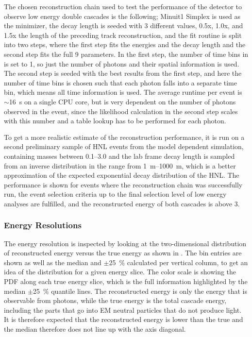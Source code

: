 The chosen reconstruction chain used to test the performance of the detector to observe low energy double cascades is the following; Minuit1 Simplex is used as the minimizer, the decay length is seeded with 3 different values, 0.5x, 1.0x, and 1.5x the length of the preceding track reconstruction, and the fit routine is split into two steps, where the first step fits the energies and the decay length and the second step fits the full 9 parameters. In the first step, the number of time bins in  is set to 1, so just the number of photons and their spatial information is used. The second step is seeded with the best results from the first step, and here the number of time bins is chosen such that each photon falls into a separate time bin, which means all time information is used. The average runtime per event is $\sim$\SI{16}{\second} on a single CPU core, but is very dependent on the number of photons observed in the event, since the likelihood calculation in the second step scales with this number and a table lookup has to be performed for each photon.

To get a more realistic estimate of the reconstruction performance, it is run on a second preliminary sample of HNL events from the model dependent simulation, containing masses between \SIrange[range-phrase=~and~]{0.1}{3.0}{\gev} and the lab frame decay length is sampled from an inverse distribution in the range from \SIrange{1}{1000}{\meter}, which is a better approximation of the expected exponential decay distribution of the HNL. The performance is shown for events where the reconstruction chain was successfully run, the event selection criteria up to the final selection level of low energy analyses are fulfilled, and the reconstructed energy of both cascades is above \SI{3}{\gev}.


\subsubsection{Energy Resolutions} 

The energy resolution is inspected by looking at the two-dimensional distribution of reconstructed energy versus the true energy as shown in . The bin entries are shown as well as the median and $\pm$\SI{25}{\percent} calculated per vertical column, to get an idea of the distribution for a given energy slice. The color scale is showing the PDF along each true energy slice, which is the full information highlighted by the median $\pm$\SI{25}{\percent} quantile lines. The reconstructed energy is only the energy that is observable from photons, while the true energy is the total cascade energy, including the parts that go into EM neutral particles that do not produce light. It is therefore expected that the reconstructed energy is lower than the true and the median therefore does not line up with the axis diagonal.

